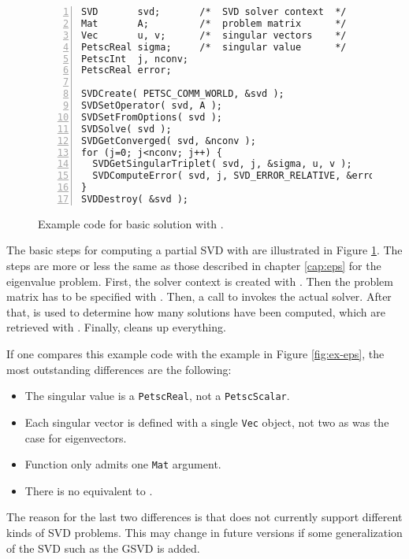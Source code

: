 \begin{figure}
\begin{Verbatim}[fontsize=\small,numbers=left,numbersep=6pt,xleftmargin=15mm]
SVD       svd;       /*  SVD solver context  */
Mat       A;         /*  problem matrix      */
Vec       u, v;      /*  singular vectors    */
PetscReal sigma;     /*  singular value      */
PetscInt  j, nconv;
PetscReal error;

SVDCreate( PETSC_COMM_WORLD, &svd );
SVDSetOperator( svd, A );
SVDSetFromOptions( svd );
SVDSolve( svd );
SVDGetConverged( svd, &nconv );
for (j=0; j<nconv; j++) {
  SVDGetSingularTriplet( svd, j, &sigma, u, v );
  SVDComputeError( svd, j, SVD_ERROR_RELATIVE, &error );
}
SVDDestroy( &svd );
\end{Verbatim}
\caption{\label{fig:ex-svd}Example code for basic solution with .}
\end{figure}

The basic steps for computing a partial SVD with \slepc are illustrated in Figure \ref{fig:ex-svd}. The steps are more or less the same as those described in chapter \ref{cap:eps} for the eigenvalue problem. First, the solver context is created with . Then the problem matrix has to be specified with . Then, a call to  invokes the actual solver. After that,  is used to determine how many solutions have been computed, which are retrieved with . Finally,  cleans up everything.

If one compares this example code with the  example in Figure \ref{fig:ex-eps}, the most outstanding differences are the following:
\begin{itemize}
\item The singular value is a \texttt{PetscReal}, not a \texttt{PetscScalar}.
\item Each singular vector is defined with a single \texttt{Vec} object, not two as was the case for eigenvectors.
\item Function  only admits one \texttt{Mat} argument.
\item There is no equivalent to .
\end{itemize}
The reason for the last two differences is that \slepc does not currently support different kinds of SVD problems. This may change in future versions if some generalization of the SVD such as the GSVD is added.

